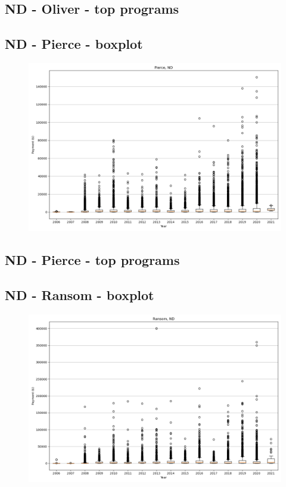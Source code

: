 \subsection*{ND - Oliver - top programs}

\newpage
\subsection*{ND - Pierce - boxplot}
\begin{figure}[h]
\centering
\includegraphics[width=7in]{../output/boxplots/counties/Pierce-ND_boxplot.png}
\end{figure}


\subsection*{ND - Pierce - top programs}

\newpage
\subsection*{ND - Ransom - boxplot}
\begin{figure}[h]
\centering
\includegraphics[width=7in]{../output/boxplots/counties/Ransom-ND_boxplot.png}
\end{figure}


